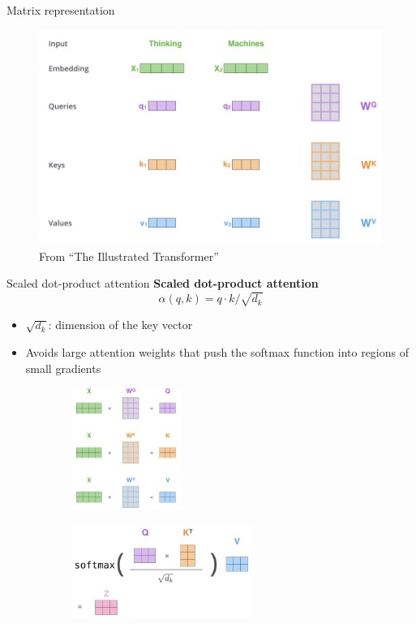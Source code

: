 \documentclass[usenames,dvipsnames,notes]{beamer}
\begin{document}
\begin{frame}
    {Matrix representation}
    \begin{figure}
        \includegraphics[height=7cm]{figures/self-attn-matrix.png}
        \caption{From ``The Illustrated Transformer''}
    \end{figure}
\end{frame}

\begin{frame}
    {Scaled dot-product attention}
    \textbf{Scaled dot-product attention}
    $$
     \alpha(q, k) = q \cdot k / \sqrt{d_k} 
    $$
    \vspace{-3em}
    \begin{itemize}
        \item $\sqrt{d_k}$: dimension of the key vector
        \item Avoids large attention weights that push the softmax function into regions of small gradients
    \end{itemize}
    \vspace{-1em}
    \begin{figure}
        \begin{subfigure}{.4\textwidth}
        \includegraphics[height=4cm]{figures/scaled-attn}
        \end{subfigure}
        \begin{subfigure}{.5\textwidth}
        \includegraphics[height=3cm]{figures/scaled-attn-2}
        \end{subfigure}
    \end{figure}
\end{frame}
\end{document}
